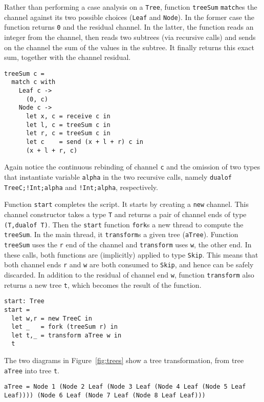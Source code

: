 Rather than performing a case analysis on a \lstinline|Tree|, function
\lstinline|treeSum| \lstinline|match|es the channel against its two
possible choices (\lstinline|Leaf| and \lstinline|Node|). In the
former case the function returns \lstinline|0| and the residual
channel. In the latter, the function reads an integer from the
channel, then reads two subtrees (via recursive calls) and sends on
the channel the sum of the values in the subtree. It finally returns
this exact sum, together with the channel residual.
%
\begin{lstlisting}
treeSum c =
  match c with
    Leaf c ->
      (0, c)
    Node c ->
      let x, c = receive c in
      let l, c = treeSum c in
      let r, c = treeSum c in
      let c    = send (x + l + r) c in
      (x + l + r, c)
\end{lstlisting}

Again notice the continuous rebinding of channel \lstinline|c| and the
omission of two types that instantiate variable \lstinline|alpha| in
the two recursive calls, namely \lstinline|dualof TreeC;!Int;alpha|
and \lstinline|!Int;alpha|, respectively.

Function \lstinline|start| completes the script. It starts by creating
a \lstinline|new| channel. This channel constructor takes a type
\lstinline|T| and returns a pair of channel ends of type
%
\lstinline|(T,dualof T)|. Then the \lstinline|start| function
\lstinline|fork|s a new thread to compute the \lstinline|treeSum|. In
the main thread, it \lstinline|transform|s a given tree
(\lstinline|aTree|). Function \lstinline|treeSum| uses the
\lstinline|r| end of the channel and \lstinline|transform| uses
\lstinline|w|, the other end. In these calls, both functions are
(implicitly) applied to type \lstinline|Skip|. This means that both
channel ends \lstinline|r| and \lstinline|w| are both consumed to
\lstinline|Skip|, and hence can be safely discarded. In addition to
the residual of channel end \lstinline|w|, function
\lstinline|transform| also returns a new tree \lstinline|t|, which
becomes the result of the function.
%
\begin{lstlisting}
start: Tree
start =
  let w,r = new TreeC in
  let _   = fork (treeSum r) in
  let t,_ = transform aTree w in
  t
\end{lstlisting}

The two diagrams in Figure~\ref{fig:trees} show a tree transformation, from tree
\lstinline|aTree| into tree \lstinline|t|.

\begin{lstlisting}
aTree = Node 1 (Node 2 Leaf (Node 3 Leaf (Node 4 Leaf (Node 5 Leaf Leaf)))) (Node 6 Leaf (Node 7 Leaf (Node 8 Leaf Leaf)))
\end{lstlisting}

